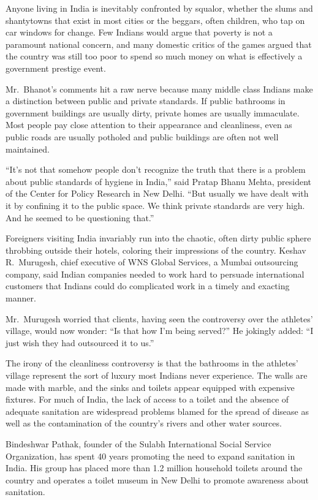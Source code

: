﻿\documentclass[12pt]{article}
\begin{document}
Anyone living in India is inevitably confronted by squalor, whether the slums and shantytowns that
exist in most cities or the beggars, often children, who tap on car windows for change. Few Indians
would argue that poverty is not a paramount national concern, and many domestic critics of the games
argued that the country was still too poor to spend so much money on what is effectively a
government prestige event.

Mr.~Bhanot's comments hit a raw nerve because many middle class Indians make a distinction between
public and private standards. If public bathrooms in government buildings are usually dirty, private
homes are usually immaculate. Most people pay close attention to their appearance and cleanliness,
even as public roads are usually potholed and public buildings are often not well maintained.

``It's not that somehow people don't recognize the truth that there is a problem about public
standards of hygiene in India,'' said Pratap Bhanu Mehta, president of the Center for Policy
Research in New Delhi. ``But usually we have dealt with it by confining it to the public space. We
think private standards are very high. And he seemed to be questioning that.''

Foreigners visiting India invariably run into the chaotic, often dirty public sphere throbbing
outside their hotels, coloring their impressions of the country. Keshav R.~Murugesh, chief executive
of WNS Global Services, a Mumbai outsourcing company, said Indian companies needed to work hard to
persuade international customers that Indians could do complicated work in a timely and exacting
manner.

Mr.~Murugesh worried that clients, having seen the controversy over the athletes' village, would now
wonder: ``Is that how I'm being served?'' He jokingly added: ``I just wish they had outsourced it to
us.''

The irony of the cleanliness controversy is that the bathrooms in the athletes' village represent
the sort of luxury most Indians never experience. The walls are made with marble, and the sinks and
toilets appear equipped with expensive fixtures. For much of India, the lack of access to a toilet
and the absence of adequate sanitation are widespread problems blamed for the spread of disease as
well as the contamination of the country's rivers and other water sources.

Bindeshwar Pathak, founder of the Sulabh International Social Service Organization, has spent 40
years promoting the need to expand sanitation in India. His group has placed more than 1.2 million
household toilets around the country and operates a toilet museum in New Delhi to promote awareness
about sanitation.
\end{document}
